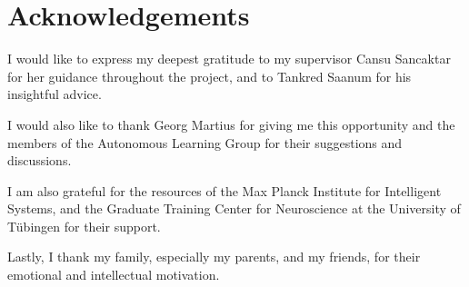 \chapter*{Acknowledgements}

I would like to express my deepest gratitude to my supervisor Cansu Sancaktar for her guidance throughout the project, and to Tankred Saanum for his insightful advice.

I would also like to thank Georg Martius for giving me this opportunity and the members of the Autonomous Learning Group for their suggestions and discussions.

I am also grateful for the resources of the Max Planck Institute for Intelligent Systems, and the Graduate Training Center for Neuroscience at the University of Tübingen for their support.

Lastly, I thank my family, especially my parents, and my friends, for their emotional and intellectual motivation.
